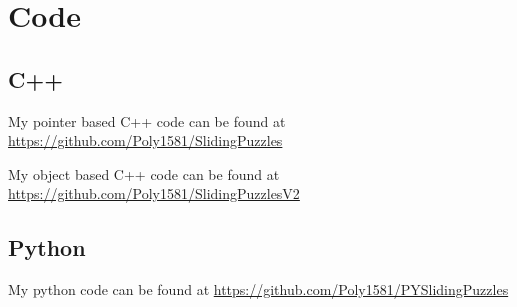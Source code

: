 \documentclass{article}
\begin{document}
\section{Code}
\subsection{C++}
My pointer based C++ code can be found at \url{https://github.com/Poly1581/SlidingPuzzles}
\par My object based C++ code can be found at \url{https://github.com/Poly1581/SlidingPuzzlesV2}
\subsection{Python}
My python code can be found at \url{https://github.com/Poly1581/PYSlidingPuzzles}
\end{document}
